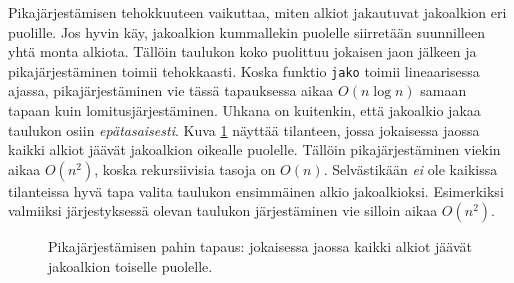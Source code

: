 Pikajärjestämisen tehokkuuteen vaikuttaa, miten alkiot jakautuvat
jakoalkion eri puolille.
Jos hyvin käy, jakoalkion kummallekin puolelle
siirretään suunnilleen yhtä monta alkiota.
Tällöin taulukon koko puolittuu jokaisen jaon jälkeen
ja pikajärjestäminen toimii tehokkaasti.
Koska funktio \texttt{jako} toimii lineaarisessa ajassa,
pikajärjestäminen vie tässä tapauksessa aikaa
$O(n \log n)$ samaan tapaan kuin lomitusjärjestäminen.
Uhkana on kuitenkin, että jakoalkio jakaa taulukon osiin \emph{epätasaisesti}.
Kuva \ref{fig:pikpah} näyttää tilanteen, jossa jokaisessa jaossa
kaikki alkiot jäävät jakoalkion oikealle puolelle.
Tällöin pikajärjestäminen viekin aikaa $O(n^2)$, koska rekursiivisia
tasoja on $O(n)$.
Selvästikään \emph{ei} ole kaikissa tilanteissa hyvä tapa
valita taulukon ensimmäinen alkio jakoalkioksi.
Esimerkiksi valmiiksi järjestyksessä olevan
taulukon järjestäminen vie silloin aikaa $O(n^2)$.

\begin{figure}
\center
{}
\caption{Pikajärjestämisen pahin tapaus: jokaisessa jaossa kaikki
alkiot jäävät jakoalkion toiselle puolelle.}
\label{fig:pikpah}
\end{figure}

